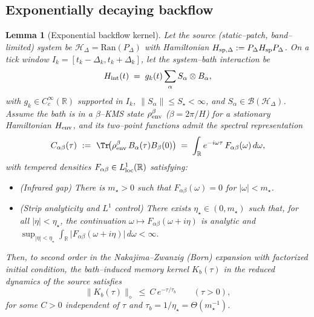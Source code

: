 \documentclass[10pt]{article}
\theoremstyle{definition}
\theoremstyle{plain}
\newtheorem{lemma}{Lemma}[section]
\begin{document}
\subsection{Exponentially decaying backflow}\label{subsec:uom-main-004}
\begin{lemma}[Exponential backflow kernel]\label{lem:app-exp-backflow}
Let the source (static–patch, band–limited) system be \(\mathcal H_\Delta=\mathrm{Ran}(P_\Delta)\) with Hamiltonian
\(H_{{\rm sp},\Delta}:=P_\Delta H_{\rm sp}P_\Delta\). On a tick window \(I_k=[t_k-\Delta_k,t_k+\Delta_k]\),
let the system–bath interaction be
\[
H_{\rm int}(t)\;=\;g_k(t)\sum_{\alpha} S_\alpha\otimes B_\alpha,
\]
with \(g_k\in C^\infty_c(\mathbb R)\) supported in \(I_k\), \(\|S_\alpha\|\le S_\star<\infty\), and \(S_\alpha\in\mathcal B(\mathcal H_\Delta)\).
Assume the bath is in a \(\beta\)–KMS state \(\rho_{\rm env}^\beta\) (\(\beta=2\pi/H\)) for a stationary Hamiltonian \(H_{\rm env}\),
and its two–point functions admit the spectral representation
\[
C_{\alpha\beta}(\tau)\ :=\ \Tr\!\big(\rho_{\rm env}^\beta\,B_\alpha(\tau)B_\beta(0)\big)
\;=\;\int_{\mathbb R} e^{-i\omega\tau}\,F_{\alpha\beta}(\omega)\,d\omega,
\]
with tempered densities \(F_{\alpha\beta}\in L^1_{\rm loc}(\mathbb R)\) satisfying:

\begin{itemize}
\item[(GAP)] (\emph{Infrared gap}) There is \(m_\star>0\) such that \(F_{\alpha\beta}(\omega)=0\) for \(|\omega|<m_\star\).
\item[(AN)] (\emph{Strip analyticity and \(L^1\) control}) There exists \(\eta_\star\in(0,m_\star)\) such that, for all \(|\eta|<\eta_\star\),
the continuation \(\omega\mapsto F_{\alpha\beta}(\omega+i\eta)\) is analytic and
\(
\sup_{|\eta|<\eta_\star}\int_{\mathbb R}\big|F_{\alpha\beta}(\omega+i\eta)\big|\,d\omega<\infty.
\)
\end{itemize}

Then, to second order in the Nakajima–Zwanzig (Born) expansion with factorized initial condition, the bath–induced
memory kernel \(K_b(\tau)\) in the reduced dynamics of the source satisfies
\[
\big\|K_b(\tau)\big\|_\diamond\ \le\ C\,e^{-\tau/\tau_b}\qquad(\tau>0),
\]
for some \(C>0\) independent of \(\tau\) and \(\tau_b=1/\eta_\star=\Theta(m_\star^{-1})\).
\end{lemma}
\end{document}
